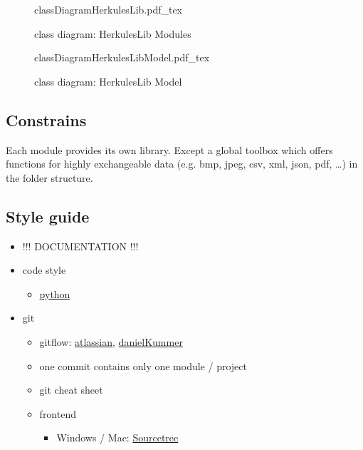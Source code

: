 \documentclass[
10pt, %
a4paper, %
onecolumn
portrait
]{article}
\begin{document}
\begin{figure}[htb]
	\centering
	{classDiagramHerkulesLib.pdf_tex}
	\caption{class diagram: HerkulesLib Modules}
	\label{fig:classDiagramHerkulesLib}
\end{figure}

\begin{figure}[htb]
	\centering
	{classDiagramHerkulesLibModel.pdf_tex}
	\caption{class diagram: HerkulesLib Model}
	\label{fig:classDiagramHerkulesLibModel}
\end{figure}

%
\FloatBarrier
\subsection{Constrains}
Each module provides its own library. Except a global toolbox which offers functions for highly exchangeable data (e.g. bmp, jpeg, csv, xml, json, pdf, \dots) in the folder structure.

\FloatBarrier
\subsection{Style guide}
\begin{itemize}
	\item !!! DOCUMENTATION !!!
	\item code style
	\begin{itemize}
		\item \href{https://www.python.org/doc/essays/styleguide/}{python}
	\end{itemize}
	\item git
	\begin{itemize}
		\item gitflow:  \href{https://www.atlassian.com/git/tutorials/comparing-workflows/gitflow-workflow}{atlassian}, 
		\href{https://danielkummer.github.io/git-flow-cheatsheet/}{danielKummer}
		\item one commit contains only one module / project
		\item git cheat sheet 
		\item frontend
			\begin{itemize}
				\item Windows / Mac: \href{https://www.sourcetreeapp.com/}{Sourcetree}
			\end{itemize}
		
	\end{itemize}
\end{itemize}
\end{document}
